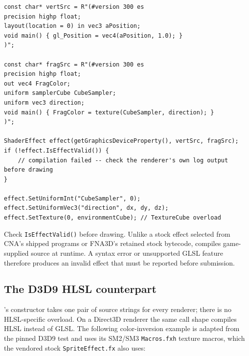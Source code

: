 \begin{lstlisting}
const char* vertSrc = R"(#version 300 es
precision highp float;
layout(location = 0) in vec3 aPosition;
void main() { gl_Position = vec4(aPosition, 1.0); }
)";

const char* fragSrc = R"(#version 300 es
precision highp float;
out vec4 FragColor;
uniform samplerCube CubeSampler;
uniform vec3 direction;
void main() { FragColor = texture(CubeSampler, direction); }
)";

ShaderEffect effect(getGraphicsDeviceProperty(), vertSrc, fragSrc);
if (!effect.IsEffectValid()) {
    // compilation failed -- check the renderer's own log output before drawing
}

effect.SetUniformInt("CubeSampler", 0);
effect.SetUniformVec3("direction", dx, dy, dz);
effect.SetTexture(0, environmentCube); // TextureCube overload
\end{lstlisting}

Check \texttt{IsEffectValid()} before drawing. Unlike a stock effect selected from CNA's shipped
programs or FNA3D's retained stock bytecode,  compiles game-supplied source
at runtime. A syntax error or unsupported GLSL feature therefore produces an invalid effect that
must be reported before submission.

\subsection{The D3D9 HLSL counterpart}

's constructor takes one pair of source strings for every renderer; there
is no HLSL-specific overload. On a Direct3D renderer the same call shape compiles HLSL instead of
GLSL. The following color-inversion example is adapted from the pinned D3D9 test and uses its
SM2/SM3 \texttt{Macros.fxh} texture macros, which the vendored stock
\texttt{SpriteEffect.fx} also uses:

